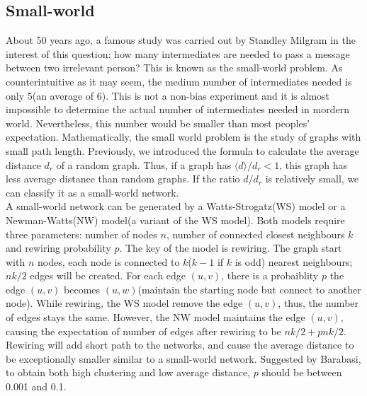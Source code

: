 \documentclass[12pt]{article}
\begin{document}
\subsection{Small-world}
About 50 years ago, a famous study was carried out by Standley Milgram\cite{milgram1967small} in the interest of this question: how many intermediates are needed to pass a message between two irrelevant person? This is known as the small-world problem. As counterintuitive as it may seem, the medium number of intermediates needed is only 5(an average of 6). This is not a non-bias experiment and it is almost impossible to determine the actual number of intermediates needed in mordern world. Nevertheless, this number would be smaller than most peoples' expectation. Mathematically, the small world problem is the study of graphs with small path length. Previously, we introduced the formula to calculate the average distance $d_r$ of a random graph. Thus, if a graph has $\langle d\rangle /d_r <1$, this graph has less average distance than random graphs. If the ratio $d/d_r$ is relatively small, we can classify it as a small-world network.\\
\noindent
A small-world network can be generated by a Watts-Strogatz(WS) model\cite{wsmodel} or a Newman-Watts(NW) model(a variant of the WS model)\cite{nwmodel}. Both models require three parameters: number of nodes $n$, number of connected closest neighbours $k$ and rewiring probability $p$. The key of the model is rewiring. The graph start with $n$ nodes, each node is connected to $k$($k-1$ if $k$ is odd) nearest neighbours; $nk/2$ edges will be created. For each edge $(u,v)$, there is a probaiblity $p$ the edge $(u,v)$ becomes $(u,w)$(maintain the starting node but connect to another node). While rewiring, the WS model remove the edge $(u,v)$, thus, the number of edges stays the same. However, the NW model maintains the edge $(u,v)$, causing the expectation of number of edges after rewiring to be $nk/2+pnk/2$. Rewiring will add short path to the networks, and cause the average distance to be exceptionally smaller similar to a small-world network. Suggested by Barabasi\cite{barabási2016network}, to obtain both high clustering and low average distance, $p$ should be between 0.001 and 0.1.\\
\end{document}
